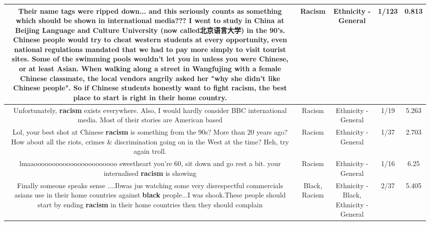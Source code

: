 \documentclass[11pt]{article}
\newlength\mylength
\begin{document}
\begin{center}
\begin{longtable}{|C{.65\mylength}|C{.30\mylength}|C{.12\mylength}|C{.12\mylength}|C{.12\mylength}|}
  \small Their name tags were ripped down... and this seriously counts as something which should be shown in international media???  I went to study in China at Beijing Language and Culture University (now called北京语言大学) in the 90's. Chinese people would try to cheat western students at every opportunity, even national regulations mandated that we had to pay more simply to visit tourist sites. Some of the swimming pools wouldn't let you in unless you were Chinese, or at least Asian. When walking along a street in Wangfujing with a female Chinese classmate, the local vendors angrily asked her "why she didn't like Chinese people". So if Chinese students honestly want to fight \textbf{racism}, the best place to start is right in their home country.\normalsize   & Racism & Ethnicity - General & 1/123 & 0.813 \\  \hline
  \small Unfortunately, \textbf{racism} exists everywhere. Also, I would hardly consider BBC international media. Most of their stories are American based\normalsize   & Racism & Ethnicity - General & 1/19 & 5.263 \\  \hline
  \small Lol, your best shot at Chinese \textbf{racism} is something from the 90s? More than 20 years ago? How about all the riots, crimes \& discrimination going on in the West at the time? Heh, try again troll.\normalsize   & Racism & Ethnicity - General & 1/37 & 2.703 \\  \hline
  \small lmaaooooooooooooooooooooooo sweetheart you're 60, sit down and go rest a bit. your internalised \textbf{racism} is showing\normalsize   & Racism & Ethnicity - General & 1/16 & 6.25 \\  \hline
  \small Finally someone speaks sense ....Ibwas jus watching some very disrespectful commercials asians use in their home countries against \textbf{black} people...I was shook.These people should start by ending \textbf{racism} in their home countries then they should complain\normalsize   & Black, Racism & Ethnicity - Black, Ethnicity - General & 2/37 & 5.405 \\  \hline

\end{longtable}
\end{center}
\end{document}
